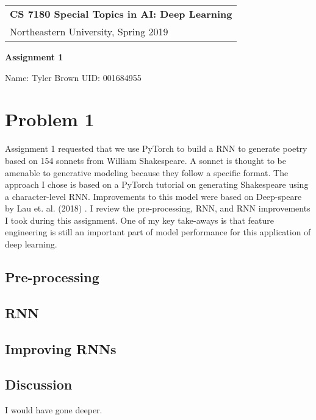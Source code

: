 \documentclass[a4paper,12pt]{article} %
\begin{document}
\thispagestyle{empty} %

\begin{tabular}{p{15.5cm}} %
{\large \bf CS 7180 Special Topics in AI: Deep Learning} \\
Northeastern University, Spring 2019 \\
\hline %
\end{tabular} %

\vspace*{0.3cm} %

\begin{center} %
    {\Large \bf Assignment 1} %
    \vspace{2mm}
    
    {Name: Tyler Brown UID: 001684955}
\end{center} 
%
\vspace{0.2cm}

\section{Problem 1}

Assignment 1 requested that we use PyTorch to build a RNN to generate
poetry based on 154 sonnets from William Shakespeare. A sonnet is thought
to be amenable to generative modeling because they follow a specific format.
The approach I chose is based on a PyTorch tutorial \cite{practica59:online}
on generating Shakespeare using a character-level RNN. Improvements to this
model were based on Deep-speare by Lau et. al. (2018) \cite{lau2018deepspeare}.
I review the pre-processing, RNN, and RNN improvements I took during this
assignment. One of my key take-aways is that feature engineering is still an
important part of model performance for this application of deep learning.

\subsection{Pre-processing}

\subsection{RNN}

\subsection{Improving RNNs}

\subsection{Discussion}

I would have gone deeper.




\end{document}
